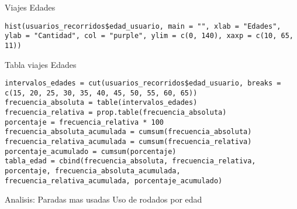 \documentclass[
]{article}
\begin{document}
Viajes Edades

\begin{verbatim}
hist(usuarios_recorridos$edad_usuario, main = "", xlab = "Edades", ylab = "Cantidad", col = "purple", ylim = c(0, 140), xaxp = c(10, 65, 11))
\end{verbatim}

Tabla viajes Edades

\begin{verbatim}
intervalos_edades = cut(usuarios_recorridos$edad_usuario, breaks = c(15, 20, 25, 30, 35, 40, 45, 50, 55, 60, 65))
frecuencia_absoluta = table(intervalos_edades)
frecuencia_relativa = prop.table(frecuencia_absoluta)
porcentaje = frecuencia_relativa * 100
frecuencia_absoluta_acumulada = cumsum(frecuencia_absoluta)
frecuencia_relativa_acumulada = cumsum(frecuencia_relativa)
porcentaje_acumulado = cumsum(porcentaje)
tabla_edad = cbind(frecuencia_absoluta, frecuencia_relativa, porcentaje, frecuencia_absoluta_acumulada, frecuencia_relativa_acumulada, porcentaje_acumulado)
\end{verbatim}

Analisis: Paradas mas usadas Uso de rodados por edad
\end{document}
